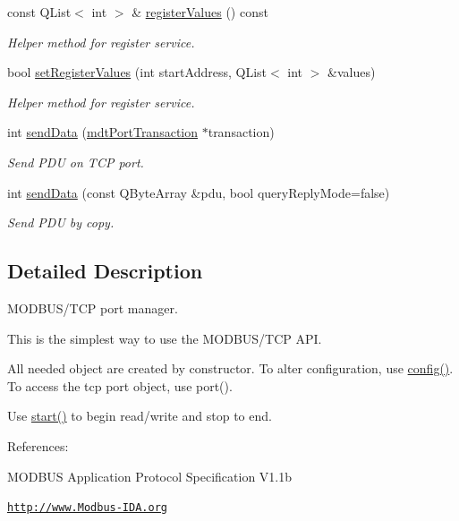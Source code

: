 \begin{DoxyCompactItemize}
const QList$<$ int $>$ \& \hyperlink{classmdt_modbus_tcp_port_manager_a99a13b5250a8523aa63869991581e56a}{registerValues} () const 
\begin{DoxyCompactList}\small\item\em Helper method for register service. \end{DoxyCompactList}\item 
bool \hyperlink{classmdt_modbus_tcp_port_manager_a746211413dfafb987a93145c9fa4876f}{setRegisterValues} (int startAddress, QList$<$ int $>$ \&values)
\begin{DoxyCompactList}\small\item\em Helper method for register service. \end{DoxyCompactList}\item 
int \hyperlink{classmdt_modbus_tcp_port_manager_a208a3b2522795974836fd8aef406725a}{sendData} (\hyperlink{classmdt_port_transaction}{mdtPortTransaction} $\ast$transaction)
\begin{DoxyCompactList}\small\item\em Send PDU on TCP port. \end{DoxyCompactList}\item 
int \hyperlink{classmdt_modbus_tcp_port_manager_ac6ffcccbba23b1bda5cba2ae347793ba}{sendData} (const QByteArray \&pdu, bool queryReplyMode=false)
\begin{DoxyCompactList}\small\item\em Send PDU by copy. \end{DoxyCompactList}\end{DoxyCompactItemize}


\subsection{Detailed Description}
MODBUS/TCP port manager. 

This is the simplest way to use the MODBUS/TCP API.

All needed object are created by constructor. To alter configuration, use \hyperlink{classmdt_port_manager_a9cf3ea2da38f81682695b37448712ffd}{config()}. To access the tcp port object, use port().

Use \hyperlink{classmdt_port_manager_af1fb103ffafc227337a59c7e82f44fbc}{start()} to begin read/write and stop to end.

References:
\begin{DoxyItemize}
\item MODBUS Application Protocol Specification V1.1b
\item \href{http://www.Modbus-IDA.org}{\tt http://www.Modbus-\/IDA.org} 
\end{DoxyItemize}

